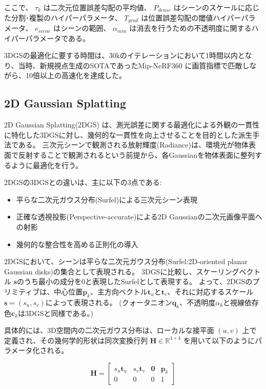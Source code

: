 ここで、
$\tau_k$ は二次元位置誤差勾配の平均値、
$P_{dense}$ はシーンのスケールに応じた分割･複製のハイパーパラメータ、
$T_{grad}$ は位置誤差勾配の閾値ハイパーパラメータ、
$e_{scene}$ はシーンの範囲、
$\alpha_{min}$ は消去を行うための不透明度に関するハイパーパラメータである。

3DGSの最適化に要する時間は、30kのイテレーションにおいて1時間以内となり、当時、新規視点生成のSOTAであったMip-NeRF360 \parencite{Barron2022CVPR_Mip-NeRF360} に画質指標で匹敵しながら、10倍以上の高速化を達成した。





\subsection{2D Gaussian Splatting}\label{sec:2DGS}
2D Gaussian Splatting(2DGS) \parencite{Huang2024SIGGRAPH_2DGS}は、測光誤差に関する最適化による外観の一貫性に特化した3DGSに対し、幾何的な一貫性を向上させることを目的とした派生手法である。
三次元シーンで観測される放射輝度(Radiance)は、環境光が物体表面で反射することで観測されるという前提から、各Gaussianを物体表面に整列するように最適化を行う。

2DGSの3DGSとの違いは、主に以下の3点である:
\begin{itemize}
  \item 平らな二次元ガウス分布(Surfel)による三次元シーン表現
  \item 正確な透視投影(Perspective-accurate)による2D Gaussianの二次元画像平面への射影
  \item 幾何的な整合性を高める正則化の導入
\end{itemize}

2DGSにおいて、シーンは平らな二次元ガウス分布(Surfel:2D-oriented planar Gaussian disks)の集合として表現される。
3DGSに比較し、スケーリングベクトル $\bm{s}$のうち最小の成分を0と表現したSurfelとして表現する。
よって、2DGSのプリミティブは、中心位置$\bm{p}_k$、主方向ベクトル$\bm{t}_u$と$\bm{t}_v$、それに対応するスケール$\bm{s} = (s_u, s_v)$によって表現される。
(クォータニオン$\bm{q}_k$、不透明度$\alpha_k$と視線依存色$\bm{c}_k$は3DGSと同様である。)


具体的には、3D空間内の二次元ガウス分布は、ローカルな接平面 $(u, v)$ 上で定義され、その幾何学的形状は同次変換行列 $\bm{H} \in \mathbb{R}^{4 \times 4}$ を用いて以下のようにパラメータ化される。

\begin{equation}\label{eq:2dgs-plane-def}
  \bm{H} = 
  \begin{bmatrix}
    s_u \bm{t}_u & s_v \bm{t}_v & \bm{0} & \bm{p}_k \\
    0 & 0 & 0 & 1
  \end{bmatrix}
\end{equation}

